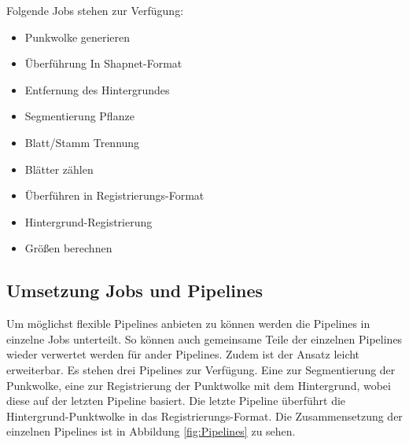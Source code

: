 \documentclass[12pt,titlepage, twoside]{article}
\begin{document}
Folgende Jobs stehen zur Verfügung:

\begin{itemize}
\item Punkwolke generieren
\item Überführung In Shapnet-Format 
\item Entfernung des Hintergrundes
\item Segmentierung Pflanze
\item Blatt/Stamm Trennung
\item Blätter zählen
\item Überführen in Registrierungs-Format 
\item Hintergrund-Registrierung
\item Größen berechnen
\end{itemize}


\subsection{Umsetzung Jobs und Pipelines}
\label{sec:realisierung:implementierung5}

Um möglichst flexible Pipelines anbieten zu können werden die Pipelines in einzelne Jobs unterteilt. So können auch gemeinsame Teile der einzelnen Pipelines wieder verwertet werden für ander Pipelines.
Zudem ist der Ansatz leicht erweiterbar. 
Es stehen drei Pipelines zur Verfügung. Eine zur Segmentierung der Punkwolke, eine zur Registrierung der Punktwolke mit dem Hintergrund, wobei diese auf der letzten Pipeline basiert.
Die letzte Pipeline überführt die Hintergrund-Punktwolke in das Registrierungs-Format.
Die Zusammensetzung der einzelnen Pipelines ist in Abbildung \ref{fig:Pipelines} zu sehen.
\end{document}
